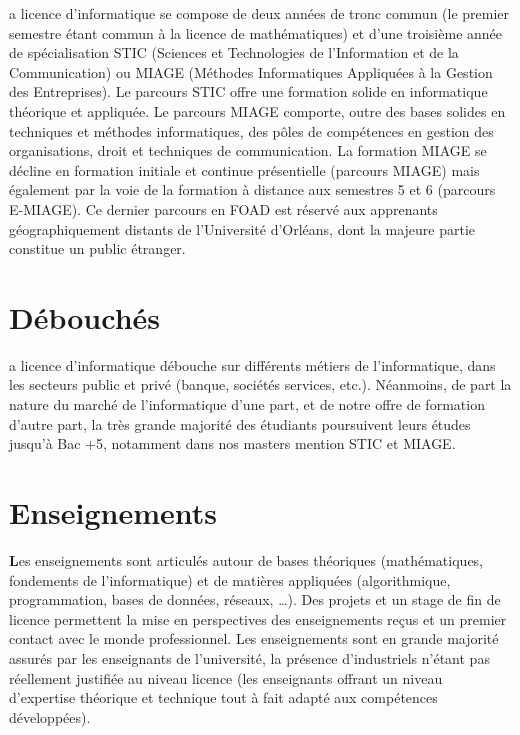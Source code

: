 \begin{spacing}{1.5}
{\begin{wrapfigure}{r}{0.35\textwidth}
            \vspace{-20pt}
      \end{wrapfigure}
a licence d’informatique se compose de deux années de tronc commun (le premier semestre étant commun à la licence de mathématiques) et d’une troisième année de spécialisation STIC (Sciences et Technologies de l’Information et de la Communication) ou MIAGE (Méthodes Informatiques Appliquées à la Gestion des Entreprises).
Le parcours STIC offre une formation solide en informatique théorique et appliquée. 
Le parcours MIAGE comporte, outre des bases solides en techniques et méthodes informatiques, des pôles de compétences en gestion des organisations, droit et techniques de communication. 
La formation MIAGE se décline en formation initiale et continue présentielle (parcours MIAGE) mais également par la voie de la formation à distance aux semestres 5 et 6 (parcours E-MIAGE). Ce dernier parcours en FOAD est réservé aux apprenants géographiquement distants de l’Université d’Orléans, dont la majeure partie constitue un public étranger.

\section*{Débouchés}
a licence d’informatique débouche sur différents métiers de l’informatique, dans les secteurs public et privé (banque, sociétés services, etc.). Néanmoins, de part la nature du marché de l’informatique d’une part, et de notre offre de formation d’autre part, la très grande majorité des étudiants poursuivent leurs études jusqu’à Bac +5, notamment dans nos masters mention STIC et MIAGE.

\section*{Enseignements}
\textcolor{couleurFonce}{\textbf{\Large{L}}}es enseignements sont articulés autour de bases théoriques (mathématiques, fondements de l’informatique) et de matières appliquées (algorithmique, programmation, bases de données, réseaux, …). Des projets et un stage de fin de licence permettent la mise en perspectives des enseignements reçus et un premier contact avec le monde professionnel.
Les enseignements sont en grande majorité assurés par les enseignants de l’université, la présence d’industriels n’étant pas réellement justifiée au niveau licence (les enseignants offrant un niveau d’expertise théorique et technique tout à fait adapté aux compétences développées).

}
\end{spacing}
